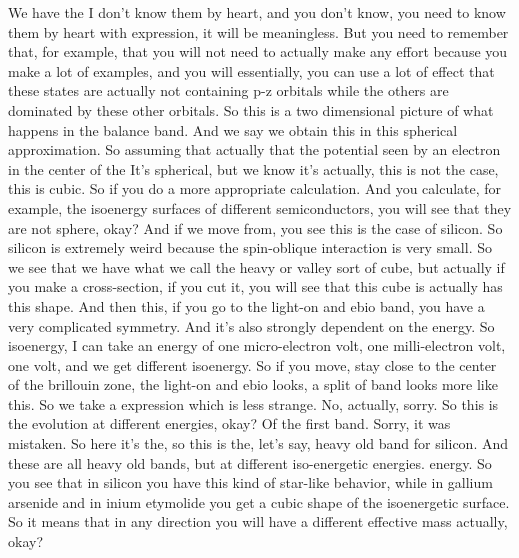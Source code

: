 We have the I don't know them by heart, and you don't know, you need to know them by heart with expression, it will be meaningless. But you need to remember that, for example, that you will not need to actually make any effort because you make a lot of examples, and you will essentially, you can use a lot of effect that these states are actually not containing p-z orbitals while the others are dominated by these other orbitals. So this is a two dimensional picture of what happens in the balance band. And we say we obtain this in this spherical approximation. So assuming that actually that the potential seen by an electron in the center of the It's spherical, but we know it's actually, this is not the case, this is cubic. So if you do a more appropriate calculation. And you calculate, for example, the isoenergy surfaces of different semiconductors, you will see that they are not sphere, okay?
And if we move from, you see this is the case of silicon. So silicon is extremely weird because the spin-oblique interaction is very small. So we see that we have what we call the heavy or valley sort of cube, but actually if you make a cross-section, if you cut it, you will see that this cube is actually has this shape. And then this, if you go to the light-on and ebio band, you have a very complicated symmetry. And it's also strongly dependent on the energy. So isoenergy, I can take an energy of one micro-electron volt, one milli-electron volt, one volt, and we get different isoenergy. So if you move, stay close to the center of the brillouin zone, the light-on and ebio looks, a split of band looks more like this. So we take a expression which is less strange. No, actually, sorry. So this is the evolution at different energies, okay? Of the first band. Sorry, it was mistaken. So here it's the, so this is the, let's say, heavy old band for silicon. And these are all heavy old bands, but at different iso-energetic energies. energy. So you see that in silicon you have this kind of star-like behavior, while in gallium arsenide and in inium etymolide you get a cubic shape of the isoenergetic surface. So it means that in any direction you will have a different effective mass actually, okay?
